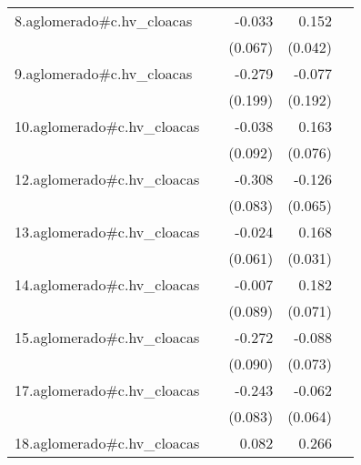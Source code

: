 {\begin{longtable}{l*{4}{D{.}{.}{-1}}}
\addlinespace
8.aglomerado#c.hv\_cloacas&                     &      -0.033         &       0.152\sym{***}&                     \\
            &                     &     (0.067)         &     (0.042)         &                     \\
\addlinespace
9.aglomerado#c.hv\_cloacas&                     &      -0.279         &      -0.077         &                     \\
            &                     &     (0.199)         &     (0.192)         &                     \\
\addlinespace
10.aglomerado#c.hv\_cloacas&                     &      -0.038         &       0.163\sym{*}  &                     \\
            &                     &     (0.092)         &     (0.076)         &                     \\
\addlinespace
12.aglomerado#c.hv\_cloacas&                     &      -0.308\sym{***}&      -0.126         &                     \\
            &                     &     (0.083)         &     (0.065)         &                     \\
\addlinespace
13.aglomerado#c.hv\_cloacas&                     &      -0.024         &       0.168\sym{***}&                     \\
            &                     &     (0.061)         &     (0.031)         &                     \\
\addlinespace
14.aglomerado#c.hv\_cloacas&                     &      -0.007         &       0.182\sym{*}  &                     \\
            &                     &     (0.089)         &     (0.071)         &                     \\
\addlinespace
15.aglomerado#c.hv\_cloacas&                     &      -0.272\sym{**} &      -0.088         &                     \\
            &                     &     (0.090)         &     (0.073)         &                     \\
\addlinespace
17.aglomerado#c.hv\_cloacas&                     &      -0.243\sym{**} &      -0.062         &                     \\
            &                     &     (0.083)         &     (0.064)         &                     \\
\addlinespace
18.aglomerado#c.hv\_cloacas&                     &       0.082         &       0.266\sym{***}&                     \\

\end{longtable}}
